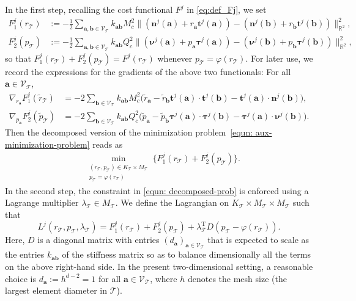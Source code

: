 \documentclass[a4paper,11pt]{article}
\theoremstyle{definition}
\theoremstyle{remark}
\numberwithin{equation}{section}
\newcommand{\disr}{r_\calT}
\newcommand{\disp}{p_\calT}
\newcommand{\distr}{{\tilde r}_\calT}
\newcommand{\distp}{{\tilde p}_\calT}
\newcommand{\disK}{K_\calT}
\newcommand{\disM}{M_\calT}
\newcommand{\disLamb}{\lambda_\calT}
\newcommand{\Real}{\mathbb{R}}
\newcommand{\ba}{{\boldsymbol a}}
\newcommand{\bb}{{\boldsymbol b}}
\newcommand{\bn}{{\boldsymbol n}}
\newcommand{\bt}{{\boldsymbol t}}
\newcommand{\bnu}{{\boldsymbol \nu}}
\newcommand{\btau}{{\boldsymbol \tau}}
\newcommand{\calT}{\mathcal{T}}
\newcommand{\calV}{\mathcal{V}}
\newcommand{\tr}{^{\mathrm{T}}}
\newcommand{\vertex}{\calV_\calT}
\begin{document}
In the first step, recalling the cost functional $F^j$ in \eqref{eq:def_Fj}, we set
\begin{subequations} \begin{align}
F^j_1(\disr) &:=-\frac12 \sum_{\ba,\bb\in\vertex} k_{\ba\bb} M_c^2\|(\bn^j(\ba)+r_{\ba}\bt^j(\ba))-(\bn^j(\bb)+r_{\bb}\bt^j(\bb))\|_{\Real^2}^2,\\
F^j_2(\disp) &:= -\frac12 \sum_{\ba,\bb\in\vertex} k_{\ba \bb}  
Q_c^2\|(\bnu^j(\ba)+p_{\ba}\btau^j(\ba))-(\bnu^j(\bb)+p_{\bb}\btau^j(\bb))\|_{\Real^2}^2,
\end{align} \end{subequations} 
so that $F^j_1(\disr)+F^j_2(\disp)=F^j(\disr)$ whenever $\disp=\varphi(\disr)$. 
For later use, we record the expressions for the gradients of the above two functionals: For all $\ba \in\vertex$,
\begin{subequations}
\begin{align}
\nabla_{r_{\ba}} F^j_1(\distr) &= -2 \sum_{\bb\in\vertex} k_{\ba\bb} M_c^2 \big({\tilde r}_{\ba} -{\tilde r}_{\bb} \bt^j(\ba)\cdot \bt^j(\bb)-\bt^j(\ba)\cdot \bn^j(\bb) \big), \label{eq:grad_F1} \\
\nabla_{p_{\ba}} F^j_2(\distp) &= -2 \sum_{\bb\in\vertex} k_{\ba\bb} Q_c^2 \big({\tilde p}_{\ba} -{\tilde p}_{\bb} \btau^j(\ba)\cdot \btau^j(\bb)-\btau^j(\ba)\cdot \bnu^j(\bb) \big). \label{eq:grad_F2}
\end{align}
\end{subequations}
Then the decomposed version of the minimization problem~\eqref{equn: aux-minimization-problem} reads as
\begin{align}\label{equn: decomposed-prob}
& \min_{\substack{(\disr,\disp)\in {\disK} \times {\disM} \\ \disp=\varphi(\disr)}}
\Big\{ F^j_1(\disr) + F^j_2(\disp) \Big\}.
\end{align}
In the second step, the constraint in \eqref{equn: decomposed-prob} is enforced using a Lagrange multiplier $\disLamb\in \disM$. We define the Lagrangian on $\disK\times \disM \times \disM$ such that
\begin{equation}\label{saddle-formulation}
{L}^j(\disr,\disp,\disLamb)=F^j_1(\disr) + F^j_2(\disp) + \disLamb\tr D (\disp-\varphi(\disr)).
\end{equation}
Here, $D$ is a diagonal matrix with entries $(d_\ba)_{\ba\in\vertex}$ that is expected to scale as the entries $k_{\ba\bb}$ of the stiffness matrix so as to balance dimensionally all the terms on the above right-hand side. In the present two-dimensional setting, a reasonable choice is $d_\ba:=h^{d-2}=1$ for all $\ba\in\vertex$, where $h$ denotes the mesh size (the largest element diameter in $\calT$). 
\end{document}
